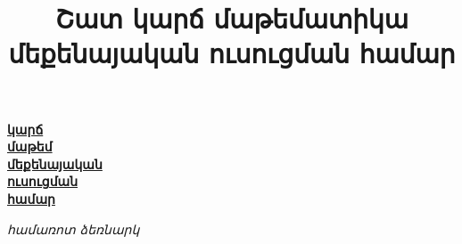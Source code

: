 \documentclass[
	a4paper, %
	fontsize=10pt, %
	twoside=true, %
	numbers=noenddot, %
]{kaobook}
\begin{document}


\title[Շատ կարճ մաթեմատիկա]{Շատ կարճ մաթեմատիկա \\ մեքենայական ուսուցման համար}


\date{ }



\frontmatter %
\def\thepage{\aroff {\roman{page}}} %




\begin{titlepage}

	\raggedleft
 
	\vspace*{\baselineskip}
	
	\vspace*{0.167\textheight}
	
	\ul{\textbf{\Huge կարճ}}\\[\baselineskip] 
	\ul{\textbf{\Huge մաթեմ}}\\[\baselineskip] 
	\ul{\textbf{\Huge մեքենայական}}\\[\baselineskip] 
	\ul{\textbf{\Huge ուսուցման}}\\[\baselineskip] 
	\ul{\textbf{\Huge համար}}\\[\baselineskip] 

 \bigskip
 \bigskip
 \bigskip
 \bigskip
 \bigskip
 \bigskip
	
	{\Large \textit{համառոտ ձեռնարկ}}
	
	\vfill

\end{titlepage}
\end{document}
